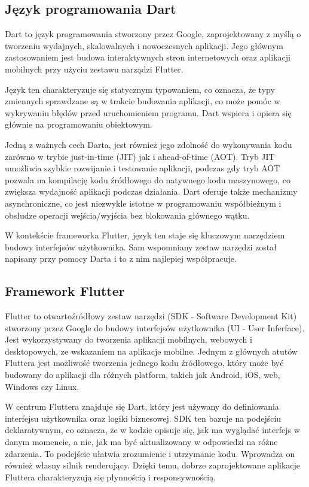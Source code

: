 \documentclass[12pt,twoside]{article}
\begin{document}
\subsection{Język programowania Dart}
Dart to język programowania stworzony przez Google, zaprojektowany z myślą o tworzeniu wydajnych, skalowalnych i nowoczesnych aplikacji. Jego głównym zastosowaniem jest budowa interaktywnych stron internetowych oraz aplikacji mobilnych przy użyciu zestawu narządzi Flutter.

Język ten charakteryzuje się statycznym typowaniem, co oznacza, że typy zmiennych sprawdzane są w trakcie budowania aplikacji, co może pomóc w wykrywaniu błędów przed uruchomieniem programu. Dart wspiera i opiera się głównie na programowaniu obiektowym.

Jedną z ważnych cech Darta, jest również jego zdolność do wykonywania kodu zarówno w trybie just-in-time (JIT) jak i ahead-of-time (AOT). Tryb JIT umożliwia szybkie rozwijanie i testowanie aplikacji, podczas gdy tryb AOT pozwala na kompilację
kodu źródłowego do natywnego kodu maszynowego, co zwiększa wydajność aplikacji podczas działania. Dart oferuje także mechanizmy asynchroniczne, co jest niezwykle istotne w programowaniu współbieżnym i obsłudze operacji wejścia/wyjścia bez blokowania głównego wątku.\cite{dartInfo}

W kontekście frameworka Flutter, język ten staje się kluczowym narzędziem budowy interfejsów użytkownika. Sam wspomniany zestaw narzędzi został napisany przy pomocy Darta i to z nim najlepiej współpracuje.
\subsection{Framework Flutter}
Flutter to otwartoźródłowy zestaw narzędzi (SDK - Software Development Kit) stworzony przez Google do budowy interfejsów użytkownika (UI - User Inferface). Jest wykorzystywany do tworzenia aplikacji mobilnych, webowych i desktopowych, ze wskazaniem na aplikacje mobilne. Jednym z głównych atutów Fluttera jest możliwość tworzenia jednego kodu źródłowego, który może być budowany do aplikacji dla różnych platform, takich jak Android, iOS, web, Windows czy Linux.

W centrum Fluttera znajduje się Dart, który jest używany do definiowania interfejsu użytkownika oraz logiki biznesowej.
SDK ten bazuje na podejściu deklaratywnym, co oznacza, że w kodzie opisuje się, jak ma wyglądać interfejs w danym momencie, a nie, jak ma być aktualizowany w odpowiedzi na różne zdarzenia. To podejście ułatwia zrozumienie i utrzymanie kodu.
Wprowadza on również własny silnik renderujący. Dzięki temu, dobrze zaprojektowane aplikacje Fluttera charakteryzują się płynnością i responsywnością.
\end{document}
